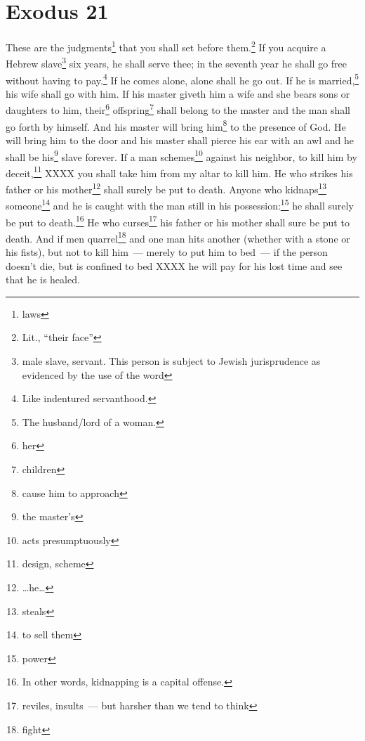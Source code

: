 \section{Exodus 21}\label{Exodus 21}
\begin{enumerate}
     These are the judgments\footnote{laws} that you shall set before them.\footnote{Lit., ``their face''}%
     If you acquire a Hebrew slave\footnote{male slave, servant. This person is subject to Jewish jurisprudence as evidenced by the use of the word } six years, he shall serve thee; in the seventh year he shall go free without having to pay.\footnote{Like indentured servanthood.}%
     If he comes alone, alone shall he go out. If he is married,\footnote{The husband/lord of a woman.} his wife shall go with him.%
     If his master giveth him a wife and she bears sons or daughters to him, their\footnote{her} offspring\footnote{children} shall belong to the master and the man shall go forth by himself.%
     And his master will bring him\footnote{cause him to approach} to the presence of God. He will bring him to the door and his master shall pierce his ear with an awl and he shall be his\footnote{the master's} slave forever.%
     If a man schemes\footnote{acts presumptuously} against his neighbor, to kill him by deceit,\footnote{design, scheme} XXXX you shall take him from my altar to kill him.%
     He who strikes his father or his mother\footnote{\dots he\dots} shall surely be put to death.%
     Anyone who kidnaps\footnote{steals} someone\footnote{to sell them} and he is caught with the man still in his possession:\footnote{power} he shall surely be put to death.\footnote{In other words, kidnapping is a capital offense.}%
     He who curses\footnote{reviles, insults~--- but harsher than we tend to think} his father or his mother shall sure be put to death.%
     And if men quarrel\footnote{fight} and one man hits another (whether with a stone or his fists), but not to kill him~--- merely to put him to bed~---%
     if the person doesn't die, but is confined to bed XXXX he will pay for his lost time and see that he is healed.%

\end{enumerate}
